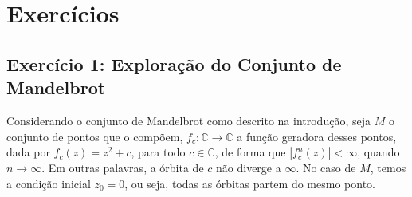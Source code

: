 \section{Exercícios}

\subsection{Exercício 1: Exploração do Conjunto de Mandelbrot}

Considerando o conjunto de Mandelbrot como descrito na introdução, seja \( M \) o
conjunto de pontos que o compõem, \( f_c : \mathbb{C} \to \mathbb{C} \) a função geradora desses pontos, dada por \( f_c (z) = z^2 + c \), para todo
\( c \in \mathbb{C} \), de forma que \( |f_c^n (z)| < \infty \), quando \( n \to \infty \). Em outras palavras, a órbita de \( c \) não diverge a \( \infty \). No caso de
\( M \), temos a condição inicial \( z_0 = 0 \), ou seja, todas as órbitas partem do mesmo ponto.

